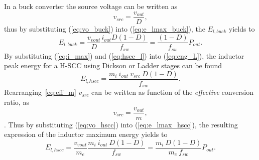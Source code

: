 In a buck converter the source voltage can be written as
\begin{equation}
v_{src}  =  \frac{v_{out}} {D},
\label{eq:vo_buck}
\end{equation}
thus by substituting (\ref{eq:vo_buck}) into (\ref{eq:e_lmax_buck}), the $E_{l,buck}$ yields to
\begin{equation}
E_{l,buck}  =  \frac{v_{vout}}{D} \frac{ i_{out}  D(1-D)}{f_{sw}} = \frac{(1-D)}{f_{sw}} P_{out}.
\label{eq:e_lmax_buck_II}
\end{equation}
By substituting (\ref{eq:i_max}) and (\ref{eq:hscc_l}) into (\ref{eq:eng_L}), the inductor peak energy for a H-SCC using Dickson or Ladder stages can be found
\begin{equation}
E_{l,hscc}  =   \frac{ m_{i} ~ i_{out} ~ v_{src} ~ D(1-D)}{f_{sw}}.
\label{eq:e_lmax_hscc}
\end{equation}
Rearranging~\eqref{eq:eff_m} $v_{src}$ can be written as function of the \emph{effective} conversion ratio, as   
\begin{equation}
v_{src}  =  \frac{v_{out}} {m},
\label{eq:vo_hscc}
\end{equation}
. Thus by substituting (\ref{eq:vo_hscc}) into (\ref{eq:e_lmax_hscc}), the resulting expression of the inductor maximum energy yields to
\begin{equation}
E_{l,hscc}  =  \frac{v_{vout}}{m_e} \frac{ m_i ~i_{out} ~ D(1-D)}{f_{sw}} = \frac{m_i~ D (1-D)}{m_e~ f_{sw}} P_{out}.
\label{eq:e_lmax_hscc_II}
\end{equation}

